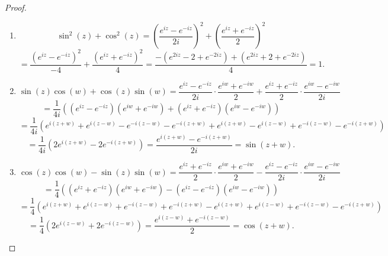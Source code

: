 \begin{proof}
    \leavevmode
    \begin{enumerate}
        \item \[
            \sin^2(z) + \cos^2(z) = \left(\frac{e^{iz} - e^{-iz}}{2i}\right)^2 + \left(\frac{e^{iz} + e^{-iz}}{2}\right)^2 
        \]
        \[
            = \frac{(e^{iz} - e^{-iz})^2}{-4} + \frac{(e^{iz} + e^{-iz})^2}{4} = \frac{-(e^{2iz} - 2 + e^{-2iz}) + (e^{2iz} + 2 + e^{-2iz})}{4} = 1.
        \]
        \item \[
            \sin(z)\cos(w) + \cos(z)\sin(w) = \frac{e^{iz} - e^{-iz}}{2i} \cdot \frac{e^{iw} + e^{-iw}}{2} + \frac{e^{iz} + e^{-iz}}{2} \cdot \frac{e^{iw} - e^{-iw}}{2i}
        \]
        \[
            = \frac{1}{4i} \left( (e^{iz} - e^{-iz})(e^{iw} + e^{-iw}) + (e^{iz} + e^{-iz})(e^{iw} - e^{-iw}) \right)
        \]
        \[
            = \frac{1}{4i} \left( e^{i(z+w)} + e^{i(z-w)} - e^{-i(z-w)} - e^{-i(z+w)} + e^{i(z+w)} - e^{i(z-w)} + e^{-i(z-w)} - e^{-i(z+w)} \right)
        \]
        \[
            = \frac{1}{4i} \left( 2e^{i(z+w)} - 2e^{-i(z+w)} \right) = \frac{e^{i(z+w)} - e^{-i(z+w)}}{2i} = \sin(z+w).
        \]
        \item \[
            \cos(z)\cos(w) - \sin(z)\sin(w) = \frac{e^{iz} + e^{-iz}}{2} \cdot \frac{e^{iw} + e^{-iw}}{2} - \frac{e^{iz} - e^{-iz}}{2i} \cdot \frac{e^{iw} - e^{-iw}}{2i}
        \]
        \[
            = \frac{1}{4} \left( (e^{iz} + e^{-iz})(e^{iw} + e^{-iw}) - (e^{iz} - e^{-iz})(e^{iw} - e^{-iw}) \right)
        \]
        \[
            = \frac{1}{4} \left( e^{i(z+w)} + e^{i(z-w)} + e^{-i(z-w)} + e^{-i(z+w)} - e^{i(z+w)} + e^{i(z-w)} + e^{-i(z-w)} - e^{-i(z+w)} \right)
        \]
        \[
            = \frac{1}{4} \left( 2e^{i(z-w)} + 2e^{-i(z-w)} \right) = \frac{e^{i(z-w)} + e^{-i(z-w)}}{2} = \cos(z+w).
        \]
    \end{enumerate}
\end{proof}


